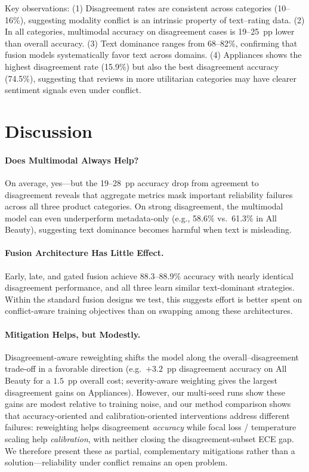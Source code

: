 \documentclass[11pt,a4paper]{article}
\begin{document}
Key observations:
(1) Disagreement rates are consistent across categories (10--16\%), suggesting modality conflict is an intrinsic property of text--rating data.
(2) In all categories, multimodal accuracy on disagreement cases is 19--25~pp lower than overall accuracy.
(3) Text dominance ranges from 68--82\%, confirming that fusion models systematically favor text across domains.
(4) Appliances shows the highest disagreement rate (15.9\%) but also the best disagreement accuracy (74.5\%), suggesting that reviews in more utilitarian categories may have clearer sentiment signals even under conflict.

\section{Discussion}

\paragraph{Does Multimodal Always Help?}
On average, yes---but the 19--28~pp accuracy drop from agreement to disagreement reveals that aggregate metrics mask important reliability failures across all three product categories.
On strong disagreement, the multimodal model can even underperform metadata-only (e.g., 58.6\% vs.\ 61.3\% in All Beauty), suggesting text dominance becomes harmful when text is misleading.

\paragraph{Fusion Architecture Has Little Effect.}
Early, late, and gated fusion achieve 88.3--88.9\% accuracy with nearly identical disagreement performance, and all three learn similar text-dominant strategies.
Within the standard fusion designs we test, this suggests effort is better spent on conflict-aware training objectives than on swapping among these architectures.

\paragraph{Mitigation Helps, but Modestly.}
Disagreement-aware reweighting shifts the model along the overall--disagreement trade-off in a favorable direction (e.g.\ $+3.2$~pp disagreement accuracy on All Beauty for a $1.5$~pp overall cost; severity-aware weighting gives the largest disagreement gains on Appliances).
However, our multi-seed runs show these gains are modest relative to training noise, and our method comparison shows that accuracy-oriented and calibration-oriented interventions address different failures: reweighting helps disagreement \emph{accuracy} while focal loss / temperature scaling help \emph{calibration}, with neither closing the disagreement-subset ECE gap.
We therefore present these as partial, complementary mitigations rather than a solution---reliability under conflict remains an open problem.
\end{document}
